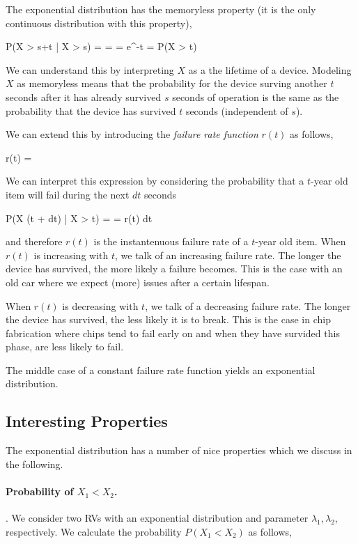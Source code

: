 The exponential distribution has the memoryless property (it is the only continuous distribution with this property),

\bee
P(X > s+t | X > s) =  =  = e^{-\lambda t} = P(X > t)
\eee

We can understand this by interpreting $X$ as a the lifetime of a device. Modeling $X$ as memoryless means that the probability for the device surving another $t$ seconds after it has already survived $s$ seconds of operation is the same as the probability that the device has survived $t$ seconds (independent of $s$).

We can extend this by introducing the \emph{failure rate function} $r(t)$ as follows,

\bee
r(t) = 
\eee

We can interpret this expression by considering the probability that a $t$-year old item will fail during the next $dt$ seconds

\bee
P(X \in (t + dt) | X > t) =  \approx {} = r(t) dt
\eee

and therefore $r(t)$ is the instantenuous failure rate of a $t$-year old item. When $r(t)$ is increasing with $t$, we talk of an increasing failure rate. The longer the device has survived, the more likely a failure becomes. This is the case with an old car where we expect (more) issues after a certain lifespan.

When $r(t)$ is decreasing with $t$, we talk of a decreasing failure rate. The longer the device has survived, the less likely it is to break. This is the case in chip fabrication where chips tend to fail early on and when they have survided this phase, are less likely to fail.

The middle case of a constant failure rate function yields an exponential distribution.


\subsection{Interesting Properties}

The exponential distribution has a number of nice properties which we discuss in the following.

\paragraph{Probability of $X_1 < X_2$.}. We consider two RVs with an exponential distribution and parameter $\lambda_1, \lambda_2$, respectively. We calculate the probability $P(X_1 < X_2)$ as follows,

